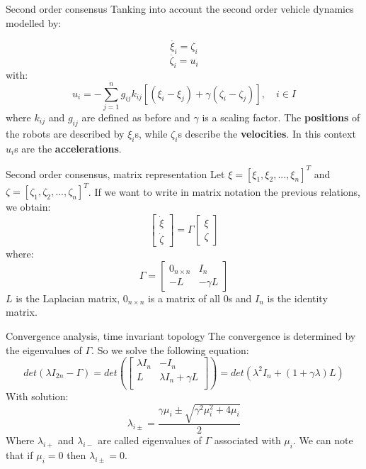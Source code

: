 \begin{frame}{Second order consensus}
\vskip 0.5cm
Tanking into account the second order vehicle dynamics modelled by:
 
{\textcolor{green!40!black}{\fontsize{13}{15}
$$ \dot{\xi_i} = \zeta_i $$
$$ \dot{\zeta_i} = u_i $$
}}
with:
{\textcolor{green!40!black}{\fontsize{13}{15}
$$u_i = -\sum_{j=1}^{n} {g_{ij} k_{ij} [(\xi_i - \xi_j)+ \gamma (\zeta_i - 	\zeta_j)]} , \quad i \in I $$
}}
\vskip 0.2cm
where $k_{ij}$ and $g_{ij}$ are defined as before and $\gamma$ is a scaling factor. 
\vskip 0.2cm
The {\textcolor{green!40!black}{\fontsize{13}{15}\textbf{positions}}} of the robots are described by $\xi_i$s, 
while $\zeta_i$s describe the {\textcolor{green!40!black}{\fontsize{13}{15}\textbf{velocities}}}. 
In this context $u_i$s are the {\textcolor{green!40!black}{\fontsize{13}{15}\textbf{accelerations}}}.

\end{frame}

\begin{frame}{Second order consensus, matrix representation}
\vskip 0.5cm
Let $\xi = [ \xi_1,\xi_2,...,\xi_n]^{T}$ and $\zeta = [\zeta_1,\zeta_2,...,\zeta_n]^{T}$. If we want to write in matrix notation the previous relations, we obtain:
\vskip 0.3cm
$$
\begin{bmatrix}\dot{\xi} \\[0.5em] \dot{\zeta}\end{bmatrix} =
\Gamma
\begin{bmatrix} \xi \\[0.5em] \zeta \end{bmatrix}
$$ 
where:
$$
\Gamma = \begin{bmatrix}
					0_{n \times n} & I_n \\[0.5em] 
					-L       &        - \gamma L 
		\end{bmatrix}
$$
\vskip 0.3cm
$L$ is the Laplacian matrix, $0_{n \times n}$ is a matrix of all  $0$s and $I_n$ is the identity matrix.
\end{frame}

\begin{frame}{Convergence analysis, time invariant topology}
\vskip 0.5cm
The convergence is determined by the eigenvalues of $\Gamma$. So we solve the following equation:
\vskip 0.3cm
$$
det(\lambda I_{2n} - \Gamma) = det \left(
							\begin{bmatrix}
								\lambda I_n & - I_n \\[0.5em]
								L  &  \lambda I_n + \gamma L\\
							\end{bmatrix}
							\right)
							= det(\lambda^2 I_{n} + ( 1 +\gamma \lambda) L)
$$
With solution:
$$
\lambda_{i\pm} = \frac{\gamma \mu_i \pm \sqrt{\gamma^2\mu_{i}^2 + 4 \mu_i}}{2}
$$
\vskip 0.3cm
Where $\lambda_{i+}$ and $\lambda_{i-}$ are called eigenvalues of $\Gamma$ associated with $\mu_i$.
We can note that if $\mu_i = 0$ then $\lambda_{i\pm} = 0$.
\end{frame}

